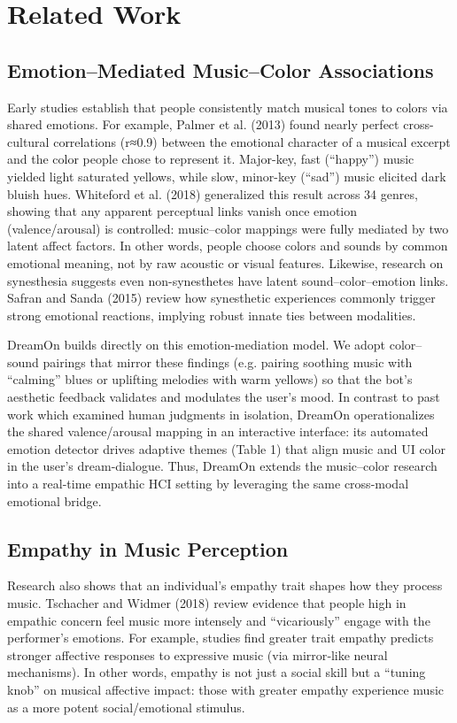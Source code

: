 \documentclass[conference]{IEEEtran}
\begin{document}
	
	\section{Related Work}
    \subsection{Emotion–Mediated Music–Color Associations}
	Early studies establish that people consistently match musical tones to colors via shared emotions. For example, Palmer et al. (2013) found nearly perfect cross-cultural correlations (r≈0.9) between the emotional character of a musical excerpt and the color people chose to represent it. Major-key, fast (“happy”) music yielded light saturated yellows, while slow, minor-key (“sad”) music elicited dark bluish hues. Whiteford et al. (2018) generalized this result across 34 genres, showing that any apparent perceptual links vanish once emotion (valence/arousal) is controlled: music–color mappings were fully mediated by two latent affect factors. In other words, people choose colors and sounds by common emotional meaning, not by raw acoustic or visual features. Likewise, research on synesthesia suggests even non-synesthetes have latent sound–color–emotion links. Safran and Sanda (2015) review how synesthetic experiences commonly trigger strong emotional reactions, implying robust innate ties between modalities.

    DreamOn builds directly on this emotion-mediation model. We adopt color–sound pairings that mirror these findings (e.g. pairing soothing music with “calming” blues or uplifting melodies with warm yellows) so that the bot’s aesthetic feedback validates and modulates the user’s mood. In contrast to past work which examined human judgments in isolation, DreamOn operationalizes the shared valence/arousal mapping in an interactive interface: its automated emotion detector drives adaptive themes (Table 1) that align music and UI color in the user’s dream-dialogue. Thus, DreamOn extends the music–color research into a real-time empathic HCI setting by leveraging the same cross-modal emotional bridge.
    
    \subsection{Empathy in Music Perception}
    Research also shows that an individual’s empathy trait shapes how they process music. Tschacher and Widmer (2018) review evidence that people high in empathic concern feel music more intensely and “vicariously” engage with the performer’s emotions. For example, studies find greater trait empathy predicts stronger affective responses to expressive music (via mirror‑like neural mechanisms). In other words, empathy is not just a social skill but a “tuning knob” on musical affective impact: those with greater empathy experience music as a more potent social/emotional stimulus.
\end{document}
